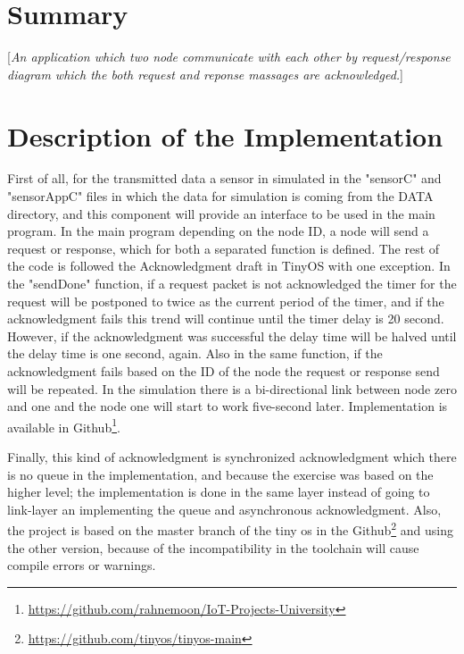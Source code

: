 \documentclass[10pt,english, openany]{book}
\begin{document}
\chapter{Summary}\label{chapt:sum}
[\textit{An application which two node communicate with each other by request/response diagram which the both request and reponse massages are acknowledged.}]
\chapter{Description of the Implementation}
First of all, for the transmitted data a sensor in simulated in the "sensorC" and "sensorAppC" files in which the data for simulation is coming from the DATA directory, and this component will provide an interface to be used in the main program. In the main program depending on the node ID, a node will send a request or response, which for both a separated function is defined. The rest of the code is followed the Acknowledgment draft in TinyOS with one exception. In the "sendDone" function, if a request packet is not acknowledged the timer for the request will be postponed to twice as the current period of the timer, and if the acknowledgment fails this trend will continue until the timer delay is 20 second. However, if the acknowledgment was successful the delay time will be halved until the delay time is one second, again. Also in the same function, if the acknowledgment fails based on the ID of the node the request or response send will be repeated. In the simulation there is a bi-directional link between node zero and one and the node one will start to work five-second later.
Implementation is available in Github\footnote{\url{https://github.com/rahnemoon/IoT-Projects-University}}.\par
Finally, this kind of acknowledgment is synchronized acknowledgment which there is no queue in the implementation, and because the exercise was based on the higher level; the implementation is done in the same layer instead of going to link-layer an implementing the queue and asynchronous acknowledgment. Also, the project is based on the master branch of the tiny os in the Github\footnote{\url{https://github.com/tinyos/tinyos-main}} and using the other version, because of the incompatibility in the toolchain will cause compile errors or warnings.
\end{document}

